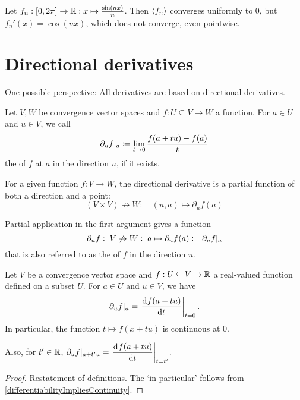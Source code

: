 \begin{example}
Let $f_n: \interval{0,2\pi} \to \R: x\mapsto \frac{\sin(nx)}{n}$. Then $\left\langle f_n \right\rangle$ converges uniformly to $0$, but $f_n'(x) = \cos(nx)$, which does not converge, even pointwise.
\end{example}



\section{Directional derivatives}
One possible perspective: All derivatives are based on directional derivatives.

\begin{definition}
Let $V,W$ be convergence vector spaces and $f:U\subseteq V\to W$ a function. For $a\in U$ and $u\in V$, we call
\[ \partial_u f|_a \coloneqq \lim_{t\to 0} \frac{f(a+tu) - f(a)}{t} \]
the  of $f$ at $a$ in the direction $u$, if it exists.
\end{definition}

For a given function $f:V\to W$, the directional derivative is a partial function of both a direction and a point:
\[ (V\times V) \not\to W:\quad (u,a) \mapsto \partial_u f(a)  \]

Partial application in the first argument gives a function
\[ \partial_u f:\; V\not\to W:\; a\mapsto \partial_u f(a) \coloneqq \partial_u f|_a \]
that is also referred to as the  of $f$ in the direction $u$.

\begin{lemma} \label{directionalDerivativeAsOD}
Let $V$ be a convergence vector space and $f:U\subseteq V\to \mathbb{R}$ a real-valued function defined on a subset $U$. For $a\in U$ and $u\in V$, we have
\[ \partial_u f|_a = \left.\mathinner{ \dfrac{\operatorname{d \!}{^{}}f(a+tu)}{\operatorname{d \!}{{t}^{}}} }\right|_{t=0}. \]
In particular, the function $t\mapsto f(x+tu)$ is continuous at $0$.

Also, for $t'\in \mathbb{R}$, $\partial_u f|_{a+t'u} = \left.\mathinner{ \dfrac{\operatorname{d \!}{^{}}f(a+tu)}{\operatorname{d \!}{{t}^{}}} }\right|_{t=t'}$. 
\end{lemma}
\begin{proof}
Restatement of definitions. The `in particular' follows from \ref{differentiabilityImpliesContinuity}.
\end{proof}

